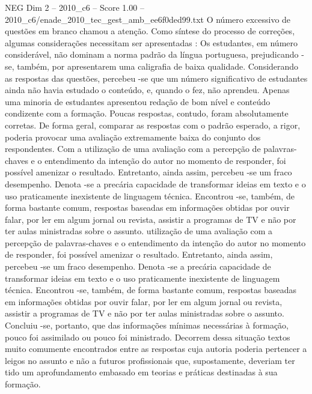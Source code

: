\begin{textsample}{NEG Dim 2 – 2010\_c6 – Score 1.00 – 2010\_c6/enade\_2010\_tec\_gest\_amb\_ee6f0ded99.txt}
O número excessivo de questões em branco chamou a atenção.
Como síntese do processo de correções, algumas considerações necessitam ser apresentadas : Os estudantes, em número considerável, não dominam a norma padrão da língua portuguesa, prejudicando -se, também, por apresentarem uma caligrafia de baixa qualidade.
Considerando as respostas das questões, percebeu -se que um número significativo de estudantes ainda não havia estudado o conteúdo, e, quando o fez, não aprendeu.
Apenas uma minoria de estudantes apresentou redação de bom nível e conteúdo condizente com a formação.
Poucas respostas, contudo, foram absolutamente corretas.
De forma geral, comparar as respostas com o padrão esperado, a rigor, poderia provocar uma avaliação extremamente baixa do conjunto dos respondentes.
Com a utilização de uma avaliação com a percepção de palavras-chaves e o entendimento da intenção do autor no momento de responder, foi possível amenizar o resultado.
Entretanto, ainda assim, percebeu -se um fraco desempenho.
Denota -se a precária capacidade de transformar ideias em texto e o uso praticamente inexistente de linguagem técnica.
Encontrou -se, também, de forma bastante comum, respostas baseadas em informações obtidas por ouvir falar, por ler em algum jornal ou revista, assistir a programas de TV e não por ter aulas ministradas sobre o assunto. utilização de uma avaliação com a percepção de palavras-chaves e o entendimento da intenção do autor no momento de responder, foi possível amenizar o resultado.
Entretanto, ainda assim, percebeu -se um fraco desempenho.
Denota -se a precária capacidade de transformar ideias em texto e o uso praticamente inexistente de linguagem técnica.
Encontrou -se, também, de forma bastante comum, respostas baseadas em informações obtidas por ouvir falar, por ler em algum jornal ou revista, assistir a programas de TV e não por ter aulas ministradas sobre o assunto.
Concluiu -se, portanto, que das informações mínimas necessárias à formação, pouco foi assimilado ou pouco foi ministrado.
Decorrem dessa situação textos muito comumente encontrados entre as respostas cuja autoria poderia pertencer a leigos no assunto e não a futuros profissionais que, supostamente, deveriam ter tido um aprofundamento embasado em teorias e práticas destinadas à sua formação.

\end{textsample}
